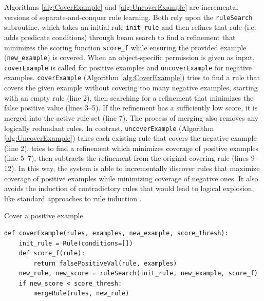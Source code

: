 \documentclass[letterpaper]{article} %
\begin{document}
Algorithms \ref{alg:CoverExample} and \ref{alg:UncoverExample} are incremental versions of separate-and-conquer rule learning. Both rely upon the \texttt{\small{ruleSearch}} subroutine, which takes an initial rule \texttt{\small{init\_rule}} and then refines that rule (i.e. adds predicate conditions) through beam search to find a refinement that minimizes the scoring function \texttt{\small{score\_f}} while ensuring the provided example (\texttt{\small{new\_example}}) is covered. When an object-specific permission is given as input, \texttt{\small{coverExample}} is called for positive examples and \texttt{\small{uncoverExample}} for negative examples. \texttt{\small{coverExample}} (Algorithm \ref{alg:CoverExample}) tries to find a rule that covers the given example without covering too many negative examples, starting with an empty rule (line 2), then searching for a refinement that minimizes the false positive value (lines 3--5). If the refinement has a sufficiently low score, it is merged into the active rule set (line 7). The process of merging also removes any logically redundant rules. In contrast, \texttt{\small{uncoverExample}} (Algorithm \ref{alg:UncoverExample}) takes each existing rule that covers the negative example (line 2), tries to find a refinement which minimizes coverage of positive examples (line 5--7), then subtracts the refinement from the original covering rule (lines 9--12). In this way, the system is able to incrementally discover rules that maximize coverage of positive examples while minimizing coverage of negative ones. It also avoids the induction of contradictory rules that would lead to logical explosion, like standard approaches to rule induction \cite{furnkranz1999separate}.

\lstset{language=Python}

\begin{algorithm}[p]
\caption{Cover a positive example}
\label{alg:CoverExample}
\begin{lstlisting}
def coverExample(rules, examples, new_example, score_thresh):
    init_rule = Rule(conditions=[])
    def score_f(rule):
        return falsePositiveVal(rule, examples)
    new_rule, new_score = ruleSearch(init_rule, new_example, score_f)
    if new_score < score_thresh:
        mergeRule(rules, new_rule)
\end{lstlisting}
\end{algorithm}
\end{document}
